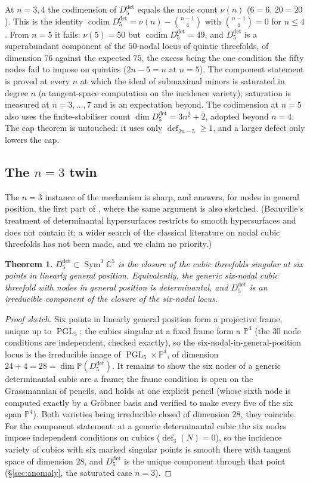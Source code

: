 \documentclass[11pt]{amsart}
\theoremstyle{plain}
\newtheorem{theorem}{Theorem}[section]
\theoremstyle{definition}
\theoremstyle{remark}
\DeclareMathOperator{\PGL}{PGL}
\DeclareMathOperator{\Sym}{Sym}
\DeclareMathOperator{\dfc}{def}
\DeclareMathOperator{\codim}{codim}
\newcommand{\bC}{\mathbb{C}}
\newcommand{\bP}{\mathbb{P}}
\newcommand{\Ddet}{D^{\det}}
\begin{document}
At $n=3,4$ the codimension of $\Ddet_5$ equals the node count $\nu(n)$
($6=6$, $20=20$).  This is the identity $\codim\Ddet_5=\nu(n)-\binom{n-1}{4}$
with $\binom{n-1}{4}=0$ for $n\le4$.  From $n=5$ it fails:
$\nu(5)=50$ but $\codim\Ddet_5=49$, and $\Ddet_5$ is a superabundant component
of the $50$-nodal locus of quintic threefolds, of dimension $76$ against the
expected $75$, the excess being the one condition the fifty nodes fail to
impose on quintics ($2n-5=n$ at $n=5$).  The component statement is proved at
every $n$ at which the ideal of submaximal minors is saturated in degree $n$
(a tangent-space computation on the incidence variety); saturation is measured
at $n=3,\dots,7$ and is an expectation beyond.  The codimension at $n=5$ also
uses the finite-stabiliser count $\dim\Ddet_5=3n^{2}+2$, adopted beyond
$n=4$.  The cap theorem is untouched: it uses
only $\dfc_{2n-5}\ge1$, and a larger defect only lowers the cap.

\subsection{The $n=3$ twin}\label{sec:twin}

The $n=3$ instance of the mechanism is sharp, and answers, for nodes in general
position, the first part of \cite[Question~8.5]{Companion}, where the same
argument is also sketched.  (Beauville's treatment of determinantal
hypersurfaces \cite{Beau} restricts to smooth hypersurfaces and does not
contain it; a wider search of the classical literature on nodal cubic
threefolds has not been made, and we claim no priority.)

\begin{theorem}\label{thm:frame}
$\Ddet_5\subset\Sym^{3}\bC^{5}$ is the closure of the cubic threefolds singular
at six points in linearly general position.  Equivalently, the generic
six-nodal cubic threefold with nodes in general position is determinantal, and
$\Ddet_5$ is an irreducible component of the closure of the six-nodal locus.
\end{theorem}

\begin{proof}[Proof sketch]
Six points in linearly general position form a projective frame, unique up to
$\PGL_5$; the cubics singular at a fixed frame form a $\bP^{4}$ (the $30$ node
conditions are independent, checked exactly), so the six-nodal-in-general-position
locus is the irreducible image of $\PGL_5\times\bP^{4}$, of dimension
$24+4=28=\dim\bP(\Ddet_5)$.  It remains to show the six nodes of a generic
determinantal cubic are a frame; the frame condition is open on the Grassmannian
of pencils, and holds at one explicit pencil (whose sixth node is computed
exactly by a Gr\"obner basis and verified to make every five of the six span
$\bP^{4}$).  Both varieties being irreducible closed of dimension $28$, they
coincide.  For the component statement: at a generic determinantal cubic the
six nodes impose independent conditions on cubics ($\dfc_3(N)=0$), so the
incidence variety of cubics with six marked singular points is smooth there
with tangent space of dimension $28$, and $\Ddet_5$ is the unique component
through that point (\S\ref{sec:anomaly}, the saturated case $n=3$).
\end{proof}
\end{document}
